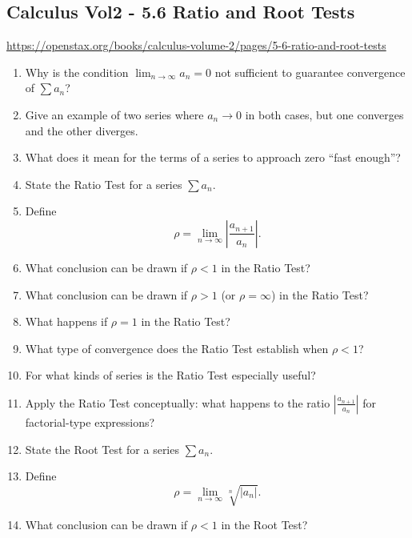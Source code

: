 \subsection{Calculus Vol2 - 5.6 Ratio and Root Tests}

\url{https://openstax.org/books/calculus-volume-2/pages/5-6-ratio-and-root-tests}

\begin{enumerate}

\item Why is the condition $\lim_{n\to\infty} a_n = 0$ not sufficient to guarantee convergence of $\sum a_n$?

\item Give an example of two series where $a_n \to 0$ in both cases, but one converges and the other diverges.

\item What does it mean for the terms of a series to approach zero “fast enough”?

\item State the Ratio Test for a series $\sum a_n$.

\item Define
  \[
    \rho = \lim_{n\to\infty} \left| \frac{a_{n+1}}{a_n} \right|.
  \]

\item What conclusion can be drawn if $\rho < 1$ in the Ratio Test?

\item What conclusion can be drawn if $\rho > 1$ (or $\rho = \infty$) in the Ratio Test?

\item What happens if $\rho = 1$ in the Ratio Test?

\item What type of convergence does the Ratio Test establish when $\rho < 1$?

\item For what kinds of series is the Ratio Test especially useful?

\item Apply the Ratio Test conceptually: what happens to the ratio $\left|\frac{a_{n+1}}{a_n}\right|$ for factorial-type expressions?

\item State the Root Test for a series $\sum a_n$.

\item Define
  \[
    \rho = \lim_{n\to\infty} \sqrt[n]{|a_n|}.
  \]

\item What conclusion can be drawn if $\rho < 1$ in the Root Test?


\end{enumerate}
